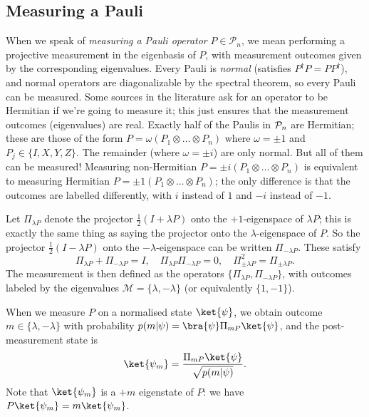 \subsection{Measuring a Pauli}

When we speak of \emph{measuring a Pauli operator} $P \in \mathcal{P}_n$, we mean performing a projective measurement in the eigenbasis of $P$, with measurement outcomes given by the corresponding eigenvalues.
Every Pauli is \emph{normal} (satisfies $P^\dagger P = P P^\dagger$), and normal operators are diagonalizable by the spectral theorem, so every Pauli can be measured.
Some sources in the literature ask for an operator to be Hermitian if we're going to measure it; this just ensures that the measurement outcomes (eigenvalues) are real.
Exactly half of the Paulis in $\mathcal{P}_n$ are Hermitian; these are those of the form $P = \omega (P_1 \otimes \ldots \otimes P_n)$ where $\omega = \pm 1$ and $P_j \in \{I, X, Y, Z\}$.
The remainder (where $\omega = \pm i$) are only normal.
But all of them can be measured!
Measuring non-Hermitian $P = \pm i (P_1 \otimes \ldots \otimes P_n)$ is equivalent to measuring Hermitian $P = \pm 1 (P_1 \otimes \ldots \otimes P_n)$; the only difference is that the outcomes are labelled differently, with $i$ instead of $1$ and $-i$ instead of $-1$.

Let $\Pi_{\lambda P}$ denote the projector $\frac{1}{2}(I + \lambda P)$ onto the $+1$-eigenspace of $\lambda P$; this is exactly the same thing as saying the projector onto the $\lambda$-eigenspace of $P$.
So the projector $\frac{1}{2}(I - \lambda P)$ onto the $-\lambda$-eigenspace can be written $\Pi_{-\lambda P}$.
These satisfy
\begin{equation}
    \Pi_{\lambda P} + \Pi_{-\lambda P} = I, \quad \Pi_{\lambda P} \Pi_{-\lambda P} = 0, \quad \Pi_{\pm \lambda P}^2 = \Pi_{\pm \lambda P}.
\end{equation}
The measurement is then defined as the operators $\{\Pi_{\lambda P}, \Pi_{-\lambda P}\}$, with outcomes labeled by the eigenvalues $\mathcal{M} = \{\lambda, -\lambda\}$ (or equivalently $\{1, -1\}$).

When we measure $P$ on a normalised state $\ket{\psi}$, we obtain outcome $m \in \{\lambda, -\lambda\}$ with probability $p(m | \psi) = \bra{\psi} \Pi_{mP} \ket{\psi}$, and the post-measurement state is
\begin{equation}
    \ket{\psi_m} = \frac{\Pi_{mP} \ket{\psi}}{\sqrt{p(m | \psi)}}.
\end{equation}
Note that $\ket{\psi_m}$ is a $+m$ eigenstate of $P$: we have $P \ket{\psi_m} = m \ket{\psi_m}$.


